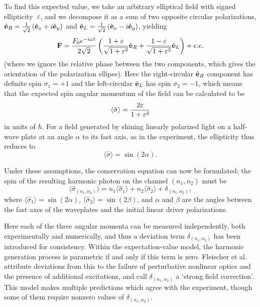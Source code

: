 To find this expected value, we take an arbitrary elliptical field with signed ellipticity~$\varepsilon$, and we decompose it as a sum of two opposite circular polarizations, $\hat{\vb{e}}_R=\tfrac{1}{\sqrt{2}}\left(\hat{\vb{e}}_x+i\hat{\vb{e}}_y\right)$ and $\hat{\vb{e}}_L=\tfrac{1}{\sqrt{2}}\left(\hat{\vb{e}}_x-i\hat{\vb{e}}_y\right)$, yielding
\begin{equation}
 \vb{F}=
 \frac{F_0e^{-i\omega t}}{2\sqrt{2}}
 \left(
 \frac{1+\varepsilon}{\sqrt{1+\varepsilon^2}}\hat{\vb{e}}_R
 +
  \frac{1-\varepsilon}{\sqrt{1+\varepsilon^2}}\hat{\vb{e}}_L
 \right)
 +\mathrm{c.c.}
 \label{e8-elliptical-as-sum-of-circular-polarizations}
\end{equation}
(where we ignore the relative phase between the two components, which gives the orientation of the polarization ellipse). Here the right-circular $\hat{\vb{e}}_R$ component has definite spin $\sigma_1=+1$ and the left-circular $\hat{\vb{e}}_L$ has spin $\sigma_2=-1$, which means that the expected spin angular momentum of the field can be calculated to be
\begin{equation}
 \langle\hat{\sigma}\rangle=\frac{2\varepsilon}{1+\varepsilon^2}
 \label{e8-expected-angular-momentum-ellitpicity}
\end{equation}
in units of $\hbar$. For a field generated by shining linearly po\-la\-rized light on a half-wave plate at an angle $\alpha$ to its fast axis, as in the experiment, the ellipticity thus reduces to 
\begin{equation}
 \langle\hat{\sigma}\rangle=\sin(2\alpha).
 \label{e8-expected-angular-momentum-from-angle}
\end{equation}



Under these assumptions, the conservation equation can now be formulated: the spin of the resulting harmonic photon on the channel $(n_1,n_2)$ must be
\begin{equation}
 \langle\hat\sigma_{(n_1,n_2)}\rangle=n_1\langle\hat\sigma_1\rangle + n_2\langle\hat\sigma_2\rangle + \delta_{(n_1,n_2)},
 \label{e8-model-1-equation}
\end{equation}
where $\langle\hat{\sigma}_1\rangle=\sin(2\alpha)$,  $\langle\hat{\sigma}_2\rangle=\sin(2\beta)$, and $\alpha$ and $\beta$ are the angles between the fast axes of the waveplates and the initial linear driver polarizations. 


Here each of the three angular momenta can be measured independently, both experimentally and numerically, and thus a deviation term $\delta_{(n_1,n_2)}$ has been introduced for consistency. Within the expectation-value model, the harmonic generation process is parametric if and only if this term is zero. Fleischer et al. attribute deviations from this to the failure of perturbative nonlinear optics and the presence of additional excitations, and call $\delta_{(n_1,n_2)}$ a `strong field correction'. This model makes multiple predictions which agree with the experiment, though some of them require nonzero values of $\delta_{(n_1,n_2)}$.

